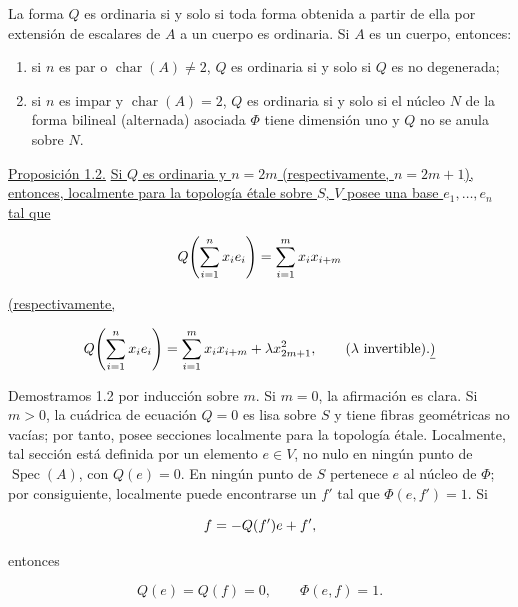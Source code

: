 La forma $Q$ es ordinaria si y solo si toda forma obtenida a partir de ella
por extensión de escalares de $A$ a un cuerpo es ordinaria. Si $A$ es un
cuerpo, entonces:

\begin{enumerate}[label=\alph*),leftmargin=2.5em]
\item si $n$ es par o $\operatorname{char}(A)\ne2$, $Q$ es ordinaria si y
solo si $Q$ es no degenerada;

\item si $n$ es impar y $\operatorname{char}(A)=2$, $Q$ es ordinaria si y
solo si el núcleo $N$ de la forma bilineal (alternada) asociada $\Phi$
tiene dimensión uno y $Q$ no se anula sobre $N$.
\end{enumerate}

\medskip
\noindent\underline{Proposición 1.2.}\quad
\underline{Si $Q$ es ordinaria y $n=2m$ (respectivamente, $n=2m+1$),
entonces, localmente para la topología étale sobre $S$, $V$ posee una base
$e_1,\ldots,e_n$ tal que}

\pageoriginale

\begin{equation*}
Q\!\left(\sum_{i=1}^{n}x_i e_i\right)
=\sum_{i=1}^{\sisi{m-1}{m}}x_i x_{i+m}
\end{equation*}

\noindent\underline{(respectivamente,}

\begin{equation*}
Q\!\left(\sum_{i=1}^{n}x_i e_i\right)
=\sum_{i=1}^{\sisi{m-1}{m}}x_i x_{i+m}
  +\lambda x_{2m+1}^{2},
\qquad (\lambda\text{ invertible}).\underline{)}
\end{equation*}


Demostramos 1.2 por inducción sobre $m$. Si $m=0$, la afirmación es clara.
Si $m>0$, la cuádrica de ecuación $Q=0$ es lisa sobre $S$ y tiene fibras
geométricas no vacías; por tanto, posee secciones localmente para la
topología étale. Localmente, tal sección está definida por un elemento
$e\in V$, no nulo en ningún punto de $\operatorname{Spec}(A)$, con
$Q(e)=0$. En ningún punto de $S$ pertenece $e$ al núcleo de $\Phi$; por
consiguiente, localmente puede encontrarse un $f'$ tal que
$\Phi(e,f')=1$. Si

\begin{equation*}
f=-Q(f')e+\sisi{f}{f'},
\end{equation*}

entonces

\begin{equation*}
Q(e)=Q(f)=0,\qquad \Phi(e,f)=1.
\end{equation*}


